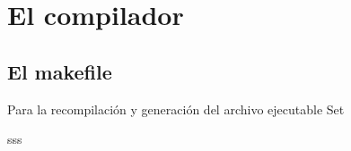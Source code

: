 \chapter{El compilador \Set}

\section{El makefile}

	Para la recompilación y generación del archivo ejecutable Set

sss